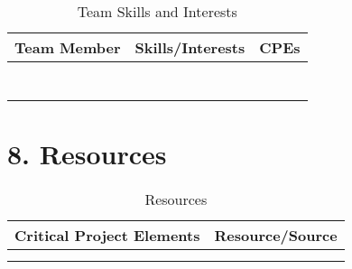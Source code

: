 \documentclass{article}
\begin{document}
\begin{table}[H]
\centering
\caption{Team Skills and Interests}

\begin{tabular}{|P{.15\textwidth}|P{.6\textwidth}|P{.15\textwidth}|}
\hline
Team Member & Skills/Interests & CPEs \\ \hline
 &         &       \\ \hline

 &  &  \\ \hline 

 &   &               \\ \hline

 &    &                 \\ \hline

 &   &                \\ \hline

&                 &  
\\ \hline

&      &              \\ \hline


\end{tabular}
\label{tab:skills}
\end{table}

\section*{8. Resources}
\begin{table}[H]
\centering
\caption{Resources}
\begin{tabular}{|P{.3\textwidth}|P{.6\textwidth}|}
\hline
Critical Project Elements & Resource/Source\hspace {7.5cm} \\ \hline
           &       
\\ \hline
 &  \\ \hline

\end{tabular}
\label{tab:Resource}
\end{table}



\newpage
\renewcommand\refname{9. References}


\end{document}
